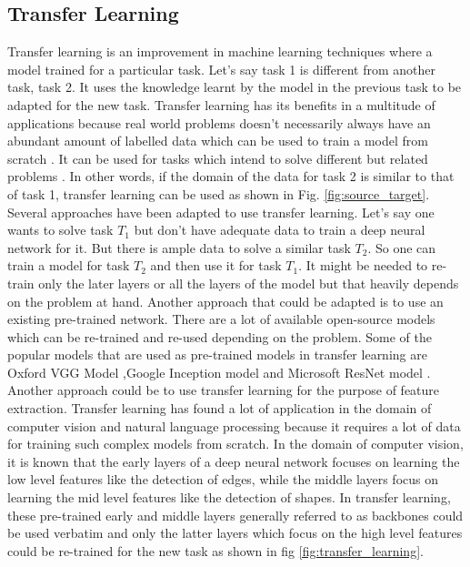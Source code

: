\subsection{Transfer Learning}
Transfer learning is an improvement in machine learning techniques where a model trained for a particular task. Let's say task 1 is different from another task, task 2. It uses the knowledge learnt by the model in the previous task to be adapted for the new task. Transfer learning has its benefits in a multitude of applications because real world problems doesn't necessarily always have an abundant amount of labelled data which can be used to train a model from scratch \cite{weiss2016survey}. It can be used for tasks which intend to solve different but related problems \cite{weiss2016survey}. In other words, if the domain of the data for task 2 is similar to that of task 1, transfer learning can be used as shown in Fig. \ref{fig:source_target}. Several approaches have been adapted to use transfer learning. Let's say one wants to solve task $T_{1}$ but don't have adequate data to train a deep neural network for it. But there is ample data to solve a similar task $T_{2}$. So one can train a model for task $T_{2}$ and then use it for task $T_{1}$. It might be needed to re-train only the later layers or all the layers of the model but that heavily depends on the problem at hand. Another approach that could be adapted is to use an existing pre-trained network. There are a lot of available open-source models which can be re-trained and re-used depending on the problem. Some of the popular models that are used as pre-trained models in transfer learning are Oxford VGG Model \cite{simonyan2014very},Google Inception model \cite{szegedy2015going} and Microsoft ResNet model \cite{he2016deep}. Another approach could be to use transfer learning for the purpose of feature extraction. Transfer learning has found a lot of application in the domain of computer vision and natural language processing because it requires a lot of data for training such complex models from scratch. In the domain of computer vision, it is known that the early layers of a deep neural network focuses on learning the low level features like the detection of edges, while the middle layers focus on learning the mid level features like the detection of shapes. In transfer learning, these pre-trained early and middle layers generally referred to as backbones could be used verbatim and only the latter layers which focus on the high level features could be re-trained for the new task as shown in fig \ref{fig:transfer_learning}.
